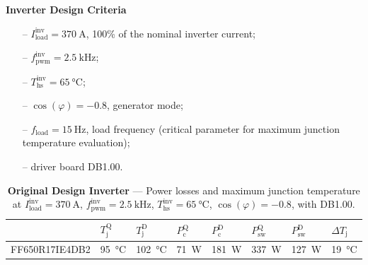 \documentclass[11pt,a4paper]{scrartcl}
\begin{document}
\begin{onehalfspace}
		\vspace{5mm}
		\noindent\textbf{Inverter Design Criteria}
		\begin{itemize}
			\item[--] $I_\text{load}^\text{inv} = \SI{370}{\ampere}$, 100\% of the nominal inverter current;
			\item[--] $f_\text{pwm}^\text{inv} = \SI{2.5}{\kilo\hertz}$;
			\item[--] $T_\text{hs}^\text{inv} = \SI{65}{\celsius}$;
			\item[--] $\cos(\varphi) = -0.8$, generator mode;
			\item[--] $f_\text{load} = \SI{15}{\hertz}$, load frequency (critical parameter for maximum junction temperature evaluation);
			\item[--] driver board DB1.00.
		\end{itemize}
		\begin{table}[H]
			\centering
			\captionsetup{width=0.75\textwidth, font=small}
			\caption{\textbf{Original Design Inverter} --- Power losses and maximum junction temperature at $I_\text{load}^\text{inv} = \SI{370}{\ampere}$, $f_\text{pwm}^\text{inv} = \SI{2.5}{\kilo\hertz}$, $T_\text{hs}^\text{inv} = \SI{65}{\celsius}$, $\cos(\varphi) = -0.8$, with DB1.00.}
			\label{}
			\renewcommand{\arraystretch}{2.0}
			\begin{tabularx}{\textwidth}{Y|Z|Z|Z|Z|Z|Z|Z}
				\hline\hline
				& $T_\text{j}^\text{Q}$ & $T_\text{j}^\text{D}$ & $P_\text{c}^\text{Q}$ & $P_\text{c}^\text{D}$ & $P_\text{sw}^\text{Q}$ & $P_\text{sw}^\text{D}$ & $\Delta T_\text{j}$ \\
				\hline
				FF650R17IE4DB2 & \SI{95}{\celsius} & \SI{102}{\celsius}  & \SI{71}{\watt} & \SI{181}{\watt}  & \SI{337}{\watt}  & \SI{127}{\watt} & \SI{19}{\celsius} \\
				\hline\hline
			\end{tabularx}
		\end{table}
		

\end{onehalfspace}
\end{document}
